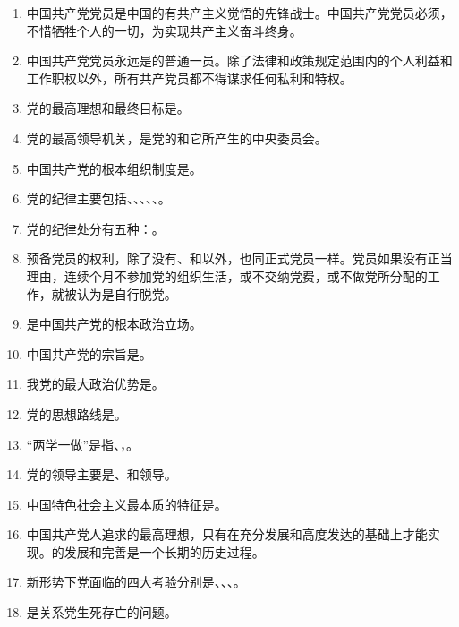 \documentclass[UTF8,11pt,a4paper]{ctexart}
\begin{document}
\begin{enumerate}[label=\textbf{\arabic*.}, leftmargin=2.5em, itemsep=0.5em]
\item 中国共产党党员是中国的有共产主义觉悟的先锋战士。中国共产党党员必须，不惜牺牲个人的一切，为实现共产主义奋斗终身。
\item 中国共产党党员永远是的普通一员。除了法律和政策规定范围内的个人利益和工作职权以外，所有共产党员都不得谋求任何私利和特权。
\item 党的最高理想和最终目标是。
\item 党的最高领导机关，是党的和它所产生的中央委员会。
\item 中国共产党的根本组织制度是。
\item 党的纪律主要包括、、、、、。
\item 党的纪律处分有五种：。
\item 预备党员的权利，除了没有、和以外，也同正式党员一样。党员如果没有正当理由，连续个月不参加党的组织生活，或不交纳党费，或不做党所分配的工作，就被认为是自行脱党。
\item {}是中国共产党的根本政治立场。
\item 中国共产党的宗旨是。
\item 我党的最大政治优势是。
\item 党的思想路线是。
\item “两学一做”是指、，。
\item 党的领导主要是、和领导。
\item 中国特色社会主义最本质的特征是。
\item 中国共产党人追求的最高理想，只有在充分发展和高度发达的基础上才能实现。的发展和完善是一个长期的历史过程。
\item 新形势下党面临的四大考验分别是、、、。
\item {}是关系党生死存亡的问题。

\end{enumerate}
\end{document}
